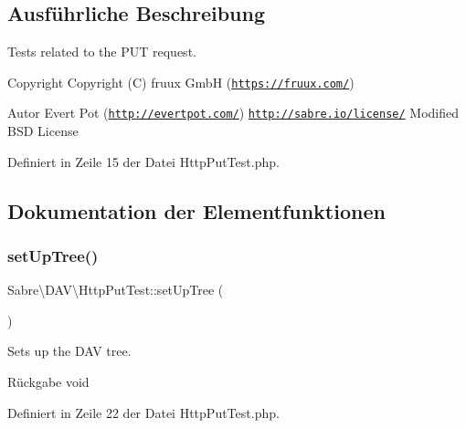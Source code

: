 \subsection{Ausführliche Beschreibung}
Tests related to the P\+UT request.

\begin{DoxyCopyright}{Copyright}
Copyright (C) fruux GmbH (\href{https://fruux.com/}{\tt https\+://fruux.\+com/}) 
\end{DoxyCopyright}
\begin{DoxyAuthor}{Autor}
Evert Pot (\href{http://evertpot.com/}{\tt http\+://evertpot.\+com/})  \href{http://sabre.io/license/}{\tt http\+://sabre.\+io/license/} Modified B\+SD License 
\end{DoxyAuthor}


Definiert in Zeile 15 der Datei Http\+Put\+Test.\+php.



\subsection{Dokumentation der Elementfunktionen}
\mbox{\label{class_sabre_1_1_d_a_v_1_1_http_put_test_a65a68f896f853cf749a35b2c89c4cf56}} 
\subsubsection{\texorpdfstring{set\+Up\+Tree()}{setUpTree()}}
{\footnotesize\ttfamily Sabre\textbackslash{}\+D\+A\+V\textbackslash{}\+Http\+Put\+Test\+::set\+Up\+Tree (\begin{DoxyParamCaption}{ }\end{DoxyParamCaption})}

Sets up the D\+AV tree.

\begin{DoxyReturn}{Rückgabe}
void 
\end{DoxyReturn}


Definiert in Zeile 22 der Datei Http\+Put\+Test.\+php.

\mbox{\label{class_sabre_1_1_d_a_v_1_1_http_put_test_a9b73170ecebaed6c945361bd5dc1cf9d}} 
